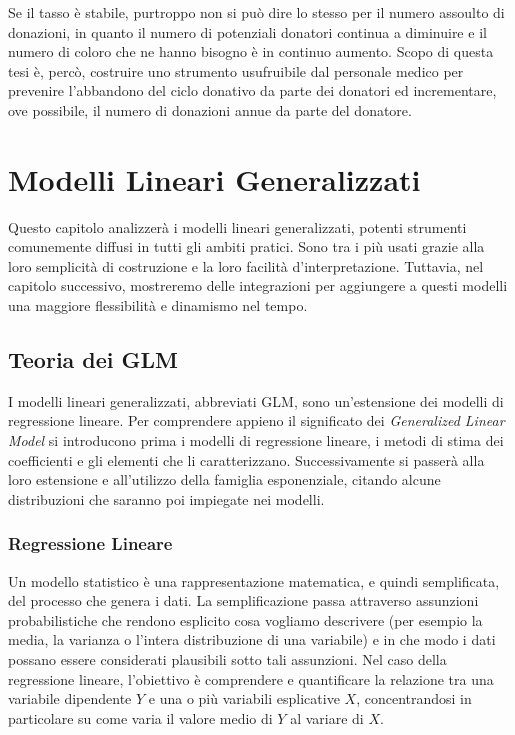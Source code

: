 \documentclass[
  italian,
  a4paper,
  a4paper,
  twoside,
  open=right,
  12pt]{scrbook}
\theoremstyle{definition}
\theoremstyle{remark}
\begin{document}
Se il tasso è stabile, purtroppo non si può dire lo stesso per il numero
assoulto di donazioni, in quanto il numero di potenziali donatori
continua a diminuire e il numero di coloro che ne hanno bisogno è in
continuo aumento. Scopo di questa tesi è, percò, costruire uno strumento
usufruibile dal personale medico per prevenire l'abbandono del ciclo
donativo da parte dei donatori ed incrementare, ove possibile, il numero
di donazioni annue da parte del donatore.


\chapter{Modelli Lineari
Generalizzati}\label{modelli-lineari-generalizzati}

Questo capitolo analizzerà i modelli lineari generalizzati, potenti
strumenti comunemente diffusi in tutti gli ambiti pratici. Sono tra i
più usati grazie alla loro semplicità di costruzione e la loro facilità
d'interpretazione. Tuttavia, nel capitolo successivo, mostreremo delle
integrazioni per aggiungere a questi modelli una maggiore flessibilità e
dinamismo nel tempo.

\section{Teoria dei GLM}\label{teoria-dei-glm}

I modelli lineari generalizzati, abbreviati GLM, sono un'estensione dei
modelli di regressione lineare. Per comprendere appieno il significato
dei \emph{Generalized Linear Model} si introducono prima i modelli di
regressione lineare, i metodi di stima dei coefficienti e gli elementi
che li caratterizzano. Successivamente si passerà alla loro estensione e
all'utilizzo della famiglia esponenziale, citando alcune distribuzioni
che saranno poi impiegate nei modelli.

\subsection{Regressione Lineare}\label{regressione-lineare}

Un modello statistico è una rappresentazione matematica, e quindi
semplificata, del processo che genera i dati. La semplificazione passa
attraverso assunzioni probabilistiche che rendono esplicito cosa
vogliamo descrivere (per esempio la media, la varianza o l'intera
distribuzione di una variabile) e in che modo i dati possano essere
considerati plausibili sotto tali assunzioni. Nel caso della regressione
lineare, l'obiettivo è comprendere e quantificare la relazione tra una
variabile dipendente \(Y\) e una o più variabili esplicative \(X\),
concentrandosi in particolare su come varia il valore medio di \(Y\) al
variare di \(X\).
\end{document}
